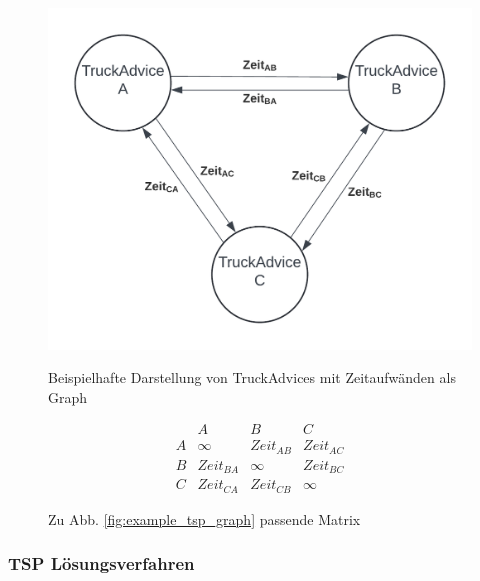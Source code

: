 \begin{figure}[H]
\centering
\begin{minipage}{.6\textwidth}
  \centering
  \includegraphics[width=\linewidth]{images/ExampleTSPGraph.png}
  \caption{Beispielhafte Darstellung von TruckAdvices mit Zeitaufwänden als Graph}
  \label{fig:example_tsp_graph}
\end{minipage}%
\begin{minipage}{.4\textwidth}
  \centering
    \[
    \begin{matrix}
         & A & B & C\\
        A & \infty & Zeit_{AB} & Zeit_{AC}\\
        B & Zeit_{BA} & \infty & Zeit_{BC}\\
        C & Zeit_{CA} & Zeit_{CB} & \infty
    \end{matrix}
    \]
  \caption{Zu Abb. \ref{fig:example_tsp_graph} passende Matrix}
  \label{fig:example_tsp_matrix}
\end{minipage}
\end{figure}









\subsubsection{TSP Lösungsverfahren}
\label{sec:tspVerfahrenPlanung}

